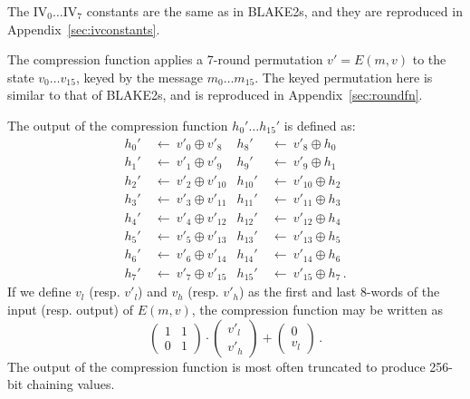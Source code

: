 \documentclass[11pt,notitlepage,a4paper]{article}
\newcommand{\IV}{\text{IV}}
\begin{document}
The $\IV_{0} \ldots \IV_{7}$ constants are the same as in
BLAKE2s, and they are reproduced in Appendix~\ref{sec:ivconstants}.

The compression function applies a 7-round permutation $v' = E(m, v)$ to
the state $v_0 \dots v_{15}$, keyed by the message $m_0 \dots m_{15}$. 
The keyed permutation here is similar to that of BLAKE2s, and is
reproduced in Appendix~\ref{sec:roundfn}.

The output of the compression function $h_{0}' \ldots h_{15}'$ is
defined as:
\begin{align*}
h_{0}'  \ & \leftarrow \ v'_{0} \oplus  v'_{8} &
h_{8}'  \ & \leftarrow \ v'_{8} \oplus  h_{0} \\
h_{1}'  \ & \leftarrow \ v'_{1} \oplus  v'_{9} &
h_{9}'  \ & \leftarrow \ v'_{9} \oplus  h_{1} \\
h_{2}'  \ & \leftarrow \ v'_{2} \oplus  v'_{10} &
h_{10}' \ & \leftarrow \ v'_{10} \oplus  h_{2} \\
h_{3}'  \ & \leftarrow \ v'_{3} \oplus  v'_{11} &
h_{11}' \ & \leftarrow \ v'_{11} \oplus  h_{3} \\
h_{4}'  \ & \leftarrow \ v'_{4} \oplus  v'_{12} &
h_{12}' \ & \leftarrow \ v'_{12} \oplus  h_{4} \\
h_{5}'  \ & \leftarrow \ v'_{5} \oplus  v'_{13} &
h_{13}' \ & \leftarrow \ v'_{13} \oplus  h_{5} \\
h_{6}'  \ & \leftarrow \ v'_{6} \oplus  v'_{14} &
h_{14}' \ & \leftarrow \ v'_{14} \oplus  h_{6} \\
h_{7}'  \ & \leftarrow \ v'_{7} \oplus  v'_{15} &
h_{15}' \ & \leftarrow \ v'_{15} \oplus  h_{7}\,.
\end{align*}
If we define $v_l$ (resp. $v'_l$) and $v_h$ (resp. $v'_h$) as the first and last 8-words of the input (resp. output) of $E(m, v)$, the compression function may be written as
\[
  \begin{pmatrix}
    1 & 1 \\
    0 & 1
  \end{pmatrix}\cdot%
  \begin{pmatrix}
  v'_l \\ v'_h
  \end{pmatrix} + 
  \begin{pmatrix}
   0 \\ v_l
  \end{pmatrix}\,.
\]
The output of the compression function is most often truncated to produce 256-bit chaining values. %
\end{document}
